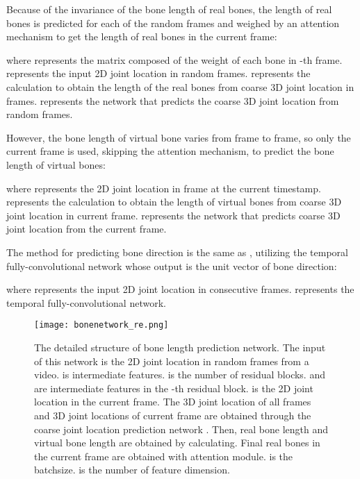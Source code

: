 \documentclass[journal]{IEEEtran}
\begin{document}
Because of the invariance of the bone length of real bones, the length of real bones is predicted for each of the random frames and weighed by an attention mechanism to get the length of real bones in the current frame:

where  represents the matrix composed of the weight of each bone in -th frame.    represents the input 2D joint location in random frames.  represents the calculation to obtain the length of the real bones from coarse 3D joint location in frames.  represents the network that predicts the coarse 3D joint location from random frames.

However, the bone length of virtual bone varies from frame to frame, so only the current frame is used, skipping the attention mechanism, {to predict the bone length of  virtual bones}:

where  represents the 2D joint location in frame at the current timestamp.  represents the calculation to obtain the length of virtual bones from coarse 3D joint location in current frame.  represents the network that predicts coarse 3D joint location from the current frame.


The method for predicting bone direction is the same as \cite{20183D}, utilizing the temporal fully-convolutional network whose output is the unit vector of bone direction:

where    represents the input 2D joint location in consecutive frames.  represents the temporal fully-convolutional network.

\begin{figure*}[t]
	\centering
	\texttt{[image: bonenetwork\_re.png]}
	\vspace{-3pt}
	\caption{The detailed structure of bone length prediction network.  {The input of this network is the 2D joint location  in random  frames from a video.  is intermediate features.  is the number of residual blocks.  and  are intermediate features in the -th residual block.  is the 2D joint location in the current frame. The 3D joint location of all frames  and 3D joint locations of current frame  are obtained through the coarse joint location prediction network . Then, real bone length  and virtual bone length  are obtained by calculating. Final real bones  in the current frame are obtained with attention module.  is the batchsize.  is the number of feature dimension.}}

	\label{fig:3}
	\vspace{-0pt}
\end{figure*}
\end{document}
